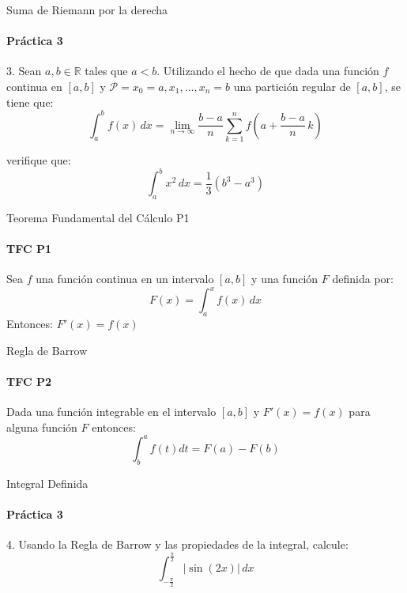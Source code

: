 \documentclass{plantillaPPT}
\begin{document}
\begin{frame}{Suma de Riemann por la derecha}
\framesubtitle{Práctica 3}

3. Sean \(a,b\in\mathbb{R}\) tales que \(a<b\). Utilizando el hecho de que dada una función \(f\) continua en \([a,b]\) y \(\mathcal{P} = {x_0=a, x_1, ..., x_n=b}\) una partición regular de \([a,b]\), se tiene que:
\[
\int_a^b f(x)\,dx = \lim_{n\to\infty} \frac{b-a}{n} \sum_{k=1}^n f\left(a + \frac{b-a}{n}\,k\right)
\]

verifique que:
\[
\int_a^b x^2\,dx = \frac{1}{3}(b^3-a^3)
\]
    
\end{frame}

\begin{frame}{Teorema Fundamental del Cálculo P1}
\framesubtitle{TFC P1}

\begin{teorema}
    Sea \(f\) una función continua en un intervalo \([a,b]\) y una función \(F\) definida por:
    \[
    F(x) = \int_a^x f(x)\,dx
    \]
    Entonces: \(\displaystyle F'(x) = f(x)\)
\end{teorema}
    
\end{frame}


\begin{frame}{Regla de Barrow}
    \framesubtitle{TFC P2}

\begin{teorema}
    Dada una función integrable en el intervalo \([a,b]\) y \(F'(x)=f(x)\) para alguna función \(F\) entonces:
    \[\int_{b}^{a}f(t)dt = F(a)-F(b)\]
\end{teorema}
    
\end{frame}

\begin{frame}{Integral Definida}
\framesubtitle{Práctica 3}

4. Usando la Regla de Barrow y las propiedades de la integral, calcule:
\[
\int_{-\frac{\pi}{2}}^{\frac{\pi}{2}} |\sin(2x)|\,dx
\]
    
\end{frame}
\end{document}

